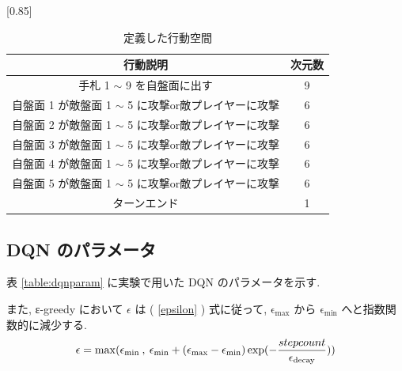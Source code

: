 \documentclass[twocolumn]{jarticle}
\begin{document}
  \begin{table}[t]
    \centering
    \caption{定義した行動空間}
    \vspace{-0.3cm}
    \label{table:action}
    \scalebox{0.80}[0.85]{
      \begin{tabular}{|c|c|}
        \hline
        行動説明                          & 次元数        \\ \hline \hline
        手札 1 $\sim$ 9 を自盤面に出す             & 9          \\ \hline
        自盤面 1 が敵盤面 1 $\sim$ 5 に攻撃or敵プレイヤーに攻撃    & 6          \\ \hline
        自盤面 2 が敵盤面 1 $\sim$ 5 に攻撃or敵プレイヤーに攻撃    & 6          \\ \hline
        自盤面 3 が敵盤面 1 $\sim$ 5 に攻撃or敵プレイヤーに攻撃    & 6          \\ \hline
        自盤面 4 が敵盤面 1 $\sim$ 5 に攻撃or敵プレイヤーに攻撃    & 6          \\ \hline
        自盤面 5 が敵盤面 1 $\sim$ 5 に攻撃or敵プレイヤーに攻撃    & 6          \\ \hline
        ターンエンド & 1 \\ \hline
        \end{tabular}
    }
    \end{table}
  
  \subsection{DQN のパラメータ}
  表 \ref{table:dqnparam} に実験で用いた DQN のパラメータを示す. \par
  また, ε-greedy において $\epsilon$ は ( \ref{epsilon} ) 式に従って, $\mathrm{\epsilon_{max}}$ から $\mathrm{\epsilon_{min}}$ へと指数関数的に減少する. 
  \begin{equation}
    \small
    \label{epsilon}
    \epsilon = \mathrm{max}(\mathrm{\epsilon_{min}} \: , \: \mathrm{\epsilon_{min}} + (\mathrm{\epsilon_{max} - \epsilon_{min}}) \exp(- \frac{stepcount}{\mathrm{\epsilon_{decay}}}))
  \end{equation}
\end{document}
